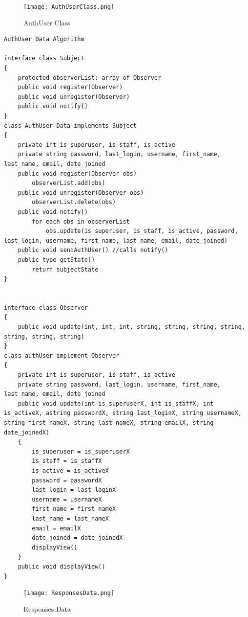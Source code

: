\documentclass[letterpaper, 12 pt, conference]{ieeeconf}
\begin{document}
\begin{figure}[h]
        \centering
        \texttt{[image: AuthUserClass.png]}
        \caption{AuthUser Class}
\end{figure}

\begin{lstlisting}
AuthUser Data Algorithm

interface class Subject
{
	protected observerList: array of Observer
	public void register(Observer)
	public void unregister(Observer)
	public void notify()
}
class AuthUser Data implements Subject
{
	private int is_superuser, is_staff, is_active
	private string password, last_login, username, first_name, last_name, email, date_joined
	public void register(Observer obs)
		observerList.add(obs)
	public void unregister(Observer obs)
		observerList.delete(obs)
	public void notify()
		for each obs in observerList
			obs.update(is_superuser, is_staff, is_active, password, last_login, username, first_name, last_name, email, date_joined)
	public void sendAuthUser() //calls notify()
	public type getState()
		return subjectState
}


interface class Observer
{
	public void update(int, int, int, string, string, string, string, string, string, string)
}
class authUser implement Observer
{
	private int is_superuser, is_staff, is_active
	private string password, last_login, username, first_name, last_name, email, date_joined
	public void update(int is_superuserX, int is_staffX, int is_activeX, astring passwordX, string last_loginX, string usernameX, string first_nameX, string last_nameX, string emailX, string date_joinedX)
	{
		is_superuser = is_superuserX
		is_staff = is_staffX
		is_active = is_activeX
		password = passwordX
		last_login = last_loginX
		username = usernameX
		first_name = first_nameX
		last_name = last_nameX
		email = emailX
		date_joined = date_joinedX
		displayView()
	}
	public void displayView()
}
\end{lstlisting}
\clearpage


\begin{figure}[h]
        \centering
        \texttt{[image: ResponsesData.png]}
        \caption{Responses Data}
    \end{figure}
\end{document}
